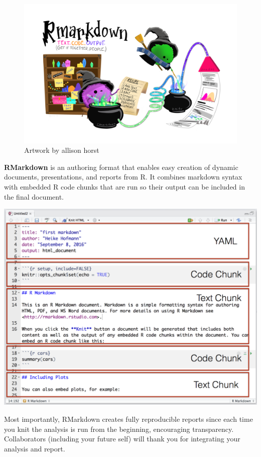 \documentclass[
]{book}
\begin{document}
\begin{figure}
\includegraphics[width=55.24in]{img/rmarkdown_wizards} \caption{Artwork by allison horst}\label{fig:unnamed-chunk-39}
\end{figure}

\textbf{RMarkdown} is an authoring format that enables easy creation of dynamic documents, presentations, and reports from R. It combines markdown syntax with embedded R code chunks that are run so their output can be included in the final document.

\includegraphics[width=19.36in]{img/rmarkdown}

Most importantly, RMarkdown creates fully reproducible reports since each time you knit the analysis is run from the beginning, encouraging transparency. Collaborators (including your future self) will thank you for integrating your analysis and report.
\end{document}
